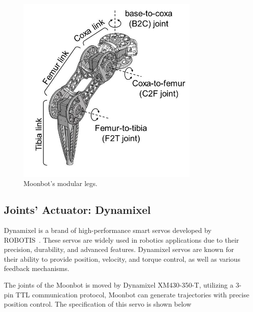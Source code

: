 \begin{figure}[h]
  \centering
  \includegraphics[width=90mm]{./fig/leg_configuration/CAD.jpg}
  \vspace{2mm}
  \caption{Moonbot's modular legs.}\label{modules}
\end{figure}

\subsection{Joints' Actuator: Dynamixel}
Dynamixel is a brand of high-performance smart servos developed by ROBOTIS~\cite{robotis}. These servos are widely used in robotics applications due to their precision, durability, and advanced features. Dynamixel servos are known for their ability to provide position, velocity, and torque control, as well as various feedback mechanisms.

The joints of the Moonbot is moved by Dynamixel XM430-350-T, utilizing a 3-pin TTL communication protocol, Moonbot can generate trajectories with precise position control. The specification of this servo is shown below\\

